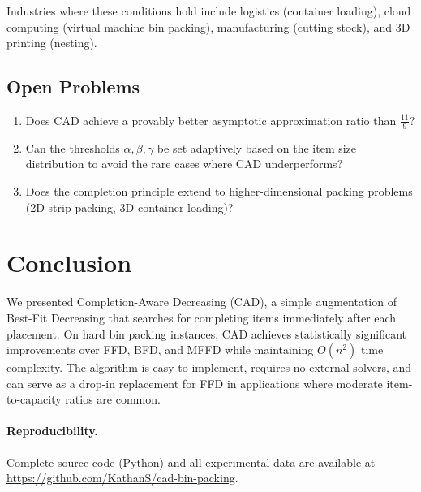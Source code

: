 \documentclass[11pt]{article}
\begin{document}
Industries where these conditions hold include logistics (container loading), cloud computing
(virtual machine bin packing), manufacturing (cutting stock), and 3D printing (nesting).

\subsection{Open Problems}

\begin{enumerate}[nosep]
  \item Does CAD achieve a provably better asymptotic approximation ratio than $\frac{11}{9}$?
  \item Can the thresholds $\alpha, \beta, \gamma$ be set adaptively based on the item size
        distribution to avoid the rare cases where CAD underperforms?
  \item Does the completion principle extend to higher-dimensional packing problems
        (2D strip packing, 3D container loading)?
\end{enumerate}

\section{Conclusion}

We presented Completion-Aware Decreasing (CAD), a simple augmentation of Best-Fit
Decreasing that searches for completing items immediately after each placement.
On hard bin packing instances, CAD achieves statistically significant improvements
over FFD, BFD, and MFFD while maintaining $O(n^2)$ time complexity. The algorithm
is easy to implement, requires no external solvers, and can serve as a drop-in
replacement for FFD in applications where moderate item-to-capacity ratios are common.

\paragraph{Reproducibility.} Complete source code (Python) and all experimental data are
available at \url{https://github.com/KathanS/cad-bin-packing}.



\end{document}

